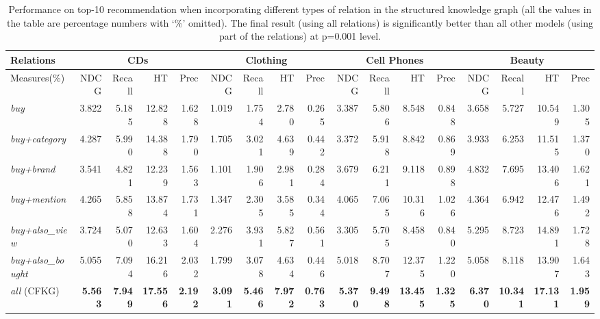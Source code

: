 \documentclass[algorithms,article,accept,moreauthors,pdftex,10pt,a4paper]{Definitions/mdpi}
\begin{document}
\begin{table*}[t]
	\caption{Performance on top-10 recommendation when incorporating different types of relation in the structured knowledge graph (all the values in the table are percentage numbers with `\%' omitted). The final result (using all relations) is significantly better than all other models (using part of the relations) at p=0.001 level.}
	\centering
	\vspace{-5pt}
	\setlength{\tabcolsep}{2pt}
	\begin{tabular}
		{l|rrrr|rrrr|rrrr|rrrr} \hline\hline
		Relations &  \multicolumn{4}{c|}{CDs} & \multicolumn{4}{c|}{Clothing} & \multicolumn{4}{c|}{Cell Phones} & \multicolumn{4}{c}{Beauty}\\\hline
		Measures(\%) & NDCG & Recall & HT & Prec & NDCG & Recall & HT & Prec & NDCG & Recall & HT & Prec & NDCG & Recall & HT & Prec \\\hline
		\textit{buy} & 3.822 & 5.185 & 12.828 & 1.628 & 1.019 & 1.754 & 2.780 & 0.265 & 3.387 & 5.806 & 8.548 & 0.848 & 3.658 & 5.727 & 10.549 & 1.305\\
		\textit{buy+category} & 4.287 & 5.990 & 14.388 & 1.790 & 1.705 & 3.021 & 4.639 & 0.442 & 3.372 & 5.918 & 8.842 & 0.869 & 3.933 & 6.253 & 11.515 & 1.370\\
		\textit{buy+brand} & 3.541 & 4.821 & 12.239 & 1.563 & 1.101 & 1.906 & 2.981 & 0.284 & 3.679 & 6.211 & 9.118 & 0.898 & 4.832 & 7.695 & 13.406 & 1.621\\
		\textit{buy+mention} & 4.265 & 5.858 & 13.874 & 1.731 & 1.347 & 2.305 & 3.585 & 0.344 & 4.065 & 7.065 & 10.316 & 1.026 & 4.364 & 6.942 & 12.476 & 1.492\\
		\textit{buy+also\_view} & 3.724 & 5.070 & 12.633 & 1.604 & 2.276 & 3.931 & 5.827 & 0.561 & 3.305 & 5.705 & 8.458 & 0.840 & 5.295 & 8.723 & 14.891 & 1.728 \\
		\textit{buy+also\_bought} & 5.055 & 7.094 & 16.216 & 2.032 & 1.799 & 3.078 & 4.634 & 0.446 & 5.018 & 8.707 & 12.375 & 1.220 & 5.058 & 8.118 & 13.907 & 1.643 \\\hline
		\textit{all} (CFKG) & \textbf{5.563} & \textbf{7.949} & \textbf{17.556} & \textbf{2.192} & \textbf{3.091} & \textbf{5.466} & \textbf{7.972} & \textbf{0.763} & \textbf{5.370} & \textbf{9.498} & \textbf{13.455} & \textbf{1.325} & \textbf{6.370} & \textbf{10.341} & \textbf{17.131} & \textbf{1.959}\\\hline
\end{tabular}\label{tab:info-result}
	\vspace{-5pt}
\end{table*}
\end{document}

